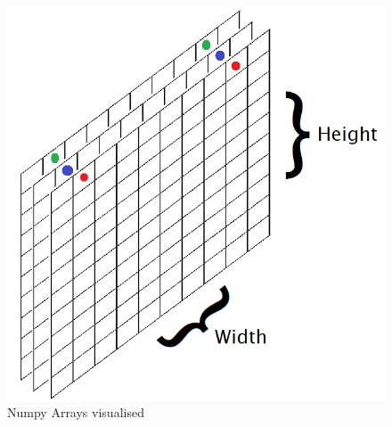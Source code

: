 \begin{figure}[H]
\centering
\includegraphics[width=1\textwidth]{Figures/Chapter3/gridlayers}
\caption{Numpy Arrays visualised}
\label{fig:gridlayers}
\end{figure}


